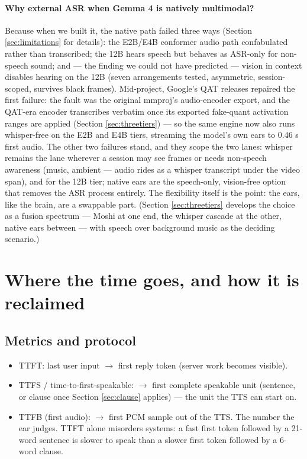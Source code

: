 \documentclass{article}
\begin{document}
\paragraph{Why external ASR when Gemma 4 is natively multimodal?} Because when we built it, the native path failed three ways (Section \ref{sec:limitations} for details): the E2B/E4B conformer audio path confabulated rather than transcribed; the 12B hears speech but behaves as ASR-only for non-speech sound; and --- the finding we could not have predicted --- vision in context disables hearing on the 12B (seven arrangements tested, asymmetric, session-scoped, survives black frames). Mid-project, Google's QAT releases repaired the first failure: the fault was the original mmproj's audio-encoder export, and the QAT-era encoder transcribes verbatim once its exported fake-quant activation ranges are applied (Section \ref{sec:threetiers}) --- so the same engine now also runs whisper-free on the E2B and E4B tiers, streaming the model's own ears to 0.46 s first audio. The other two failures stand, and they scope the two lanes: whisper remains the lane wherever a session may see frames or needs non-speech awareness (music, ambient --- audio rides as a whisper transcript under the video span), and for the 12B tier; native ears are the speech-only, vision-free option that removes the ASR process entirely. The flexibility itself is the point: the ears, like the brain, are a swappable part. (Section \ref{sec:threetiers} develops the choice as a fusion spectrum --- Moshi at one end, the whisper cascade at the other, native ears between --- with speech over background music as the deciding scenario.)

\section{Where the time goes, and how it is reclaimed}

\subsection{Metrics and protocol}
\label{sec:metrics}

\begin{itemize}
	\item TTFT: last user input $\rightarrow$ first reply token (server work becomes visible).
	\item TTFS / time-to-first-speakable: $\rightarrow$ first complete speakable unit (sentence, or clause once Section \ref{sec:clause} applies) --- the unit the TTS can start on.
	\item TTFB (first audio): $\rightarrow$ first PCM sample out of the TTS. The number the ear judges. TTFT alone misorders systems: a fast first token followed by a 21-word sentence is slower to speak than a slower first token followed by a 6-word clause.
\end{itemize}
\end{document}
